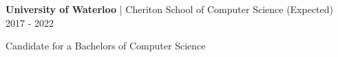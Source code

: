 


\begin{cventries}


\cventry
{\textbf{University of Waterloo} | Cheriton School of Computer Science}
{(Expected) 2017 - 2022}
{ %
\begin{cvitems}
\item {Candidate for a Bachelors of Computer Science}
\end{cvitems}
}


\end{cventries}